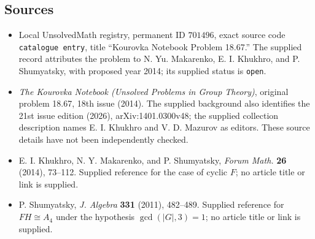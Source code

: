 \documentclass[11pt]{article}
\begin{document}
\subsection{Sources}
\begin{itemize}
\item Local UnsolvedMath registry, permanent ID \(701496\), exact source code \texttt{catalogue entry}, title ``Kourovka Notebook Problem 18.67.'' The supplied record attributes the problem to N. Yu. Makarenko, E. I. Khukhro, and P. Shumyatsky, with proposed year 2014; its supplied status is \texttt{open}.
\item \emph{The Kourovka Notebook (Unsolved Problems in Group Theory)}, original problem 18.67, 18th issue (2014). The supplied background also identifies the 21st issue edition (2026), arXiv:1401.0300v48; the supplied collection description names E. I. Khukhro and V. D. Mazurov as editors. These source details have not been independently checked.
\item E. I. Khukhro, N. Y. Makarenko, and P. Shumyatsky, \emph{Forum Math.} \textbf{26} (2014), 73--112. Supplied reference for the case of cyclic \(F\); no article title or link is supplied.
\item P. Shumyatsky, \emph{J. Algebra} \textbf{331} (2011), 482--489. Supplied reference for \(FH\cong A_4\) under the hypothesis \(\gcd(|G|,3)=1\); no article title or link is supplied.
\end{itemize}
\end{document}
